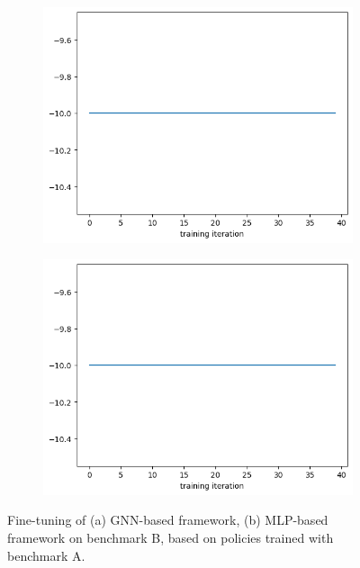 \documentclass[letterpaper]{article}
\begin{document}
\begin{figure}[h!]
    \centering
    \begin{subfigure}[b]{0.45\textwidth}
        \includegraphics[width=\textwidth]{figure/fine_tuning.png}
        \caption{}
    \end{subfigure}
    \begin{subfigure}[b]{0.45\textwidth}
        \includegraphics[width=\textwidth]{figure/fine_tuning.png}
        \caption{}
    \end{subfigure}
    \caption{Fine-tuning  of (a) GNN-based framework, (b) MLP-based framework on benchmark B, based on policies trained with benchmark A.}
    \label{fig:ft}
\end{figure}
\end{document}
